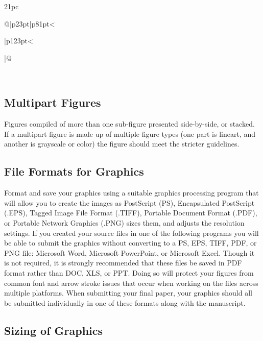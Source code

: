 \documentclass[journal]{IEEEtai}
\begin{document}
\begin{table}
\begin{tabular*}{21pc}{@{}|p{23pt}|p{81pt}<{\raggedright{}}|p{123pt}<{\raggedright{}}|@{}}
\\
\end{tabular*}
\label{tab1}
\end{table}



\subsection{Multipart Figures}

Figures compiled of more than one sub-figure presented side-by-side, or stacked. If a multipart figure is made up of multiple figure types (one part is lineart, and another is grayscale or color) the figure should meet the stricter guidelines.

\subsection{File Formats for Graphics}

Format and save your graphics using a suitable graphics processing program that will allow you to create the images as PostScript (PS), Encapsulated PostScript (.EPS), Tagged Image File Format (.TIFF), Portable Document Format (.PDF), or Portable Network Graphics (.PNG) sizes them, and adjusts the resolution settings. If you created your source files in one of the following programs you will be able to submit the graphics without converting to a PS, EPS, TIFF, PDF, or PNG file: Microsoft Word, Microsoft PowerPoint, or Microsoft Excel. Though it is not required, it is strongly recommended that these files be saved in PDF format rather than DOC, XLS, or PPT. Doing so will protect your figures from common font and arrow stroke issues that occur when working on the files across multiple platforms. When submitting your final paper, your graphics should all be submitted individually in one of these formats along with the manuscript.


\subsection{Sizing of Graphics}
\end{document}
